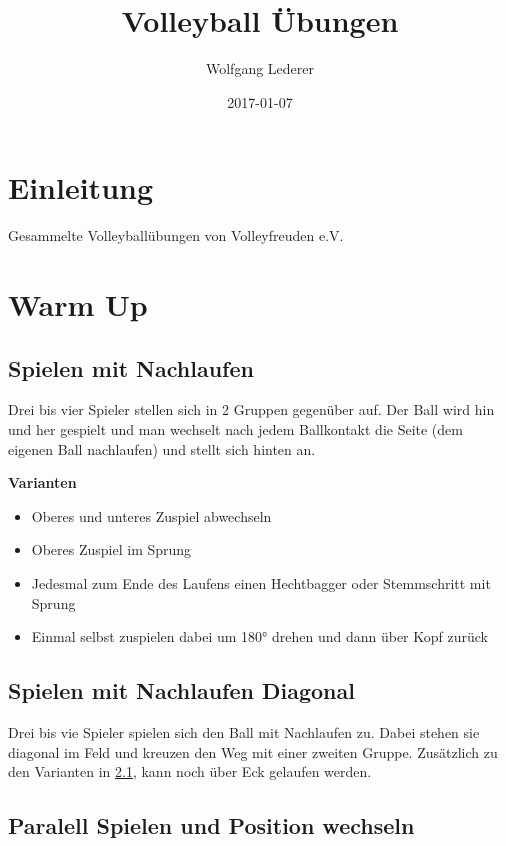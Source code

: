 \documentclass[]{book}
\title{Volleyball Übungen}
\author{Wolfgang Lederer}
\date{2017-01-07}
\providecommand{\tightlist}{%
  \setlength{\itemsep}{0pt}\setlength{\parskip}{0pt}}
\begin{document}
\maketitle

{
\setcounter{tocdepth}{1}
\tableofcontents
}
\chapter{Einleitung}\label{einleitung}

Gesammelte Volleyballübungen von Volleyfreuden e.V.

\chapter{Warm Up}\label{warm-up}

\section{Spielen mit Nachlaufen}\label{spielen-mit-nachlaufen}

Drei bis vier Spieler stellen sich in 2 Gruppen gegenüber auf. Der Ball
wird hin und her gespielt und man wechselt nach jedem Ballkontakt die
Seite (dem eigenen Ball nachlaufen) und stellt sich hinten an.

\textbf{Varianten}

\begin{itemize}
\tightlist
\item
  Oberes und unteres Zuspiel abwechseln
\item
  Oberes Zuspiel im Sprung
\item
  Jedesmal zum Ende des Laufens einen Hechtbagger oder Stemmschritt mit
  Sprung
\item
  Einmal selbst zuspielen dabei um 180° drehen und dann über Kopf zurück
\end{itemize}

\section{Spielen mit Nachlaufen
Diagonal}\label{spielen-mit-nachlaufen-diagonal}

Drei bis vie Spieler spielen sich den Ball mit Nachlaufen zu. Dabei
stehen sie diagonal im Feld und kreuzen den Weg mit einer zweiten
Gruppe. Zusätzlich zu den Varianten in \ref{spielen-mit-nachlaufen},
kann noch über Eck gelaufen werden.

\section{Paralell Spielen und Position
wechseln}\label{paralell-spielen-und-position-wechseln}
\end{document}
